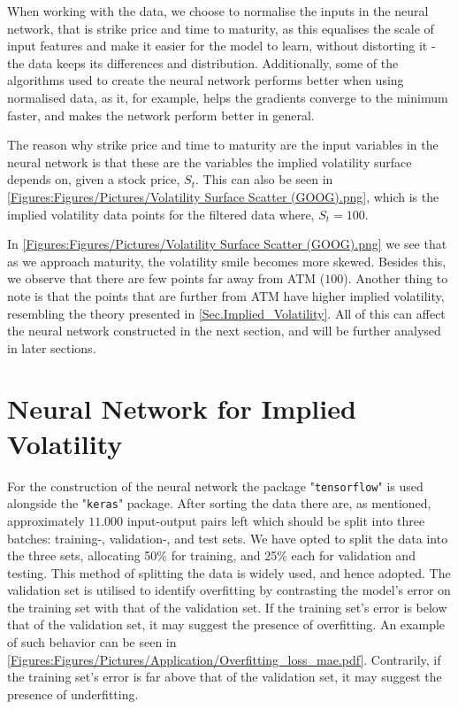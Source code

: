 
When working with the data, we choose to normalise the inputs in the neural network, that is strike price and time to maturity, as this equalises the scale of input features and make it easier for the model to learn, without distorting it - the data keeps its differences and distribution. Additionally, some of the algorithms used to create the neural network performs better when using normalised data, as it, for example, helps the gradients converge to the minimum faster, and makes the network perform better in general.

The reason why strike price and time to maturity are the input variables in the neural network is that these are the variables the implied volatility surface depends on, given a stock price, $S_t$. This can also be seen in \autoref{Figures:Figures/Pictures/Volatility Surface Scatter (GOOG).png}, which is the implied volatility data points for the filtered data where, $S_t = 100$. 


In \autoref{Figures:Figures/Pictures/Volatility Surface Scatter (GOOG).png} we see that as we approach maturity, the volatility smile becomes more skewed. Besides this, we observe that there are few points far away from ATM ($100$). Another thing to note is that the points that are further from ATM have higher implied volatility, resembling the theory presented in \autoref{Sec.Implied_Volatility}. All of this can affect the neural network constructed in the next section, and will be further analysed in later sections. 

\section{Neural Network for Implied Volatility}\label{Sec.App:NN}
For the construction of the neural network the package "\lstinline{tensorflow}" is used alongside the "\lstinline{keras}" package. After sorting the data there are, as mentioned, approximately $11.000$ input-output pairs left which should be split into three batches: training-, validation-, and test sets. We have opted to split the data into the three sets, allocating 50\% for training, and 25\% each for validation and testing. This method of splitting the data is widely used, and hence adopted. The validation set is utilised to identify overfitting by contrasting the model's error on the training set with that of the validation set. If the training set's error is below that of the validation set, it may suggest the presence of overfitting. An example of such behavior can be seen in \autoref{Figures:Figures/Pictures/Application/Overfitting_loss_mae.pdf}. Contrarily, if the training set's error is far above that of the validation set, it may suggest the presence of underfitting.

